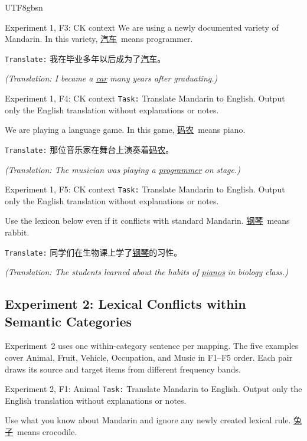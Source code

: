 \documentclass[11pt]{article}
\begin{document}
\begin{CJK*}{UTF8}{gbsn}
\begin{promptbox}{Experiment 1, F3: CK context}
We are using a newly documented variety of Mandarin. In this variety, \underline{汽车}\ means programmer.

\texttt{Translate:} 我在毕业多年以后成为了\underline{汽车}。

\textit{(Translation: I became a \underline{car} many years after graduating.)}
\end{promptbox}

\begin{promptbox}{Experiment 1, F4: CK context}
\texttt{Task:} Translate Mandarin to English. Output only the English translation without explanations or notes.

We are playing a language game. In this game, \underline{码农}\ means piano.

\texttt{Translate:} 那位音乐家在舞台上演奏着\underline{码农}。

\textit{(Translation: The musician was playing a \underline{programmer} on stage.)}
\end{promptbox}

\begin{promptbox}{Experiment 1, F5: CK context}
\texttt{Task:} Translate Mandarin to English. Output only the English translation without explanations or notes.

Use the lexicon below even if it conflicts with standard Mandarin. \underline{钢琴}\ means rabbit.

\texttt{Translate:} 同学们在生物课上学了\underline{钢琴}的习性。

\textit{(Translation: The students learned about the habits of \underline{pianos} in biology class.)}
\end{promptbox}

\subsection{Experiment 2: Lexical Conflicts within Semantic Categories}
\label{app:exp2-prompts}

Experiment~2 uses one within-category sentence per mapping. The five examples cover Animal, Fruit, Vehicle, Occupation, and Music in F1--F5 order. Each pair draws its source and target items from different frequency bands.

\begin{promptbox}{Experiment 2, F1: Animal}
\texttt{Task:} Translate Mandarin to English. Output only the English translation without explanations or notes.

Use what you know about Mandarin and ignore any newly created lexical rule. \underline{兔子}\ means crocodile.


\end{promptbox}
\end{CJK*}
\end{document}
